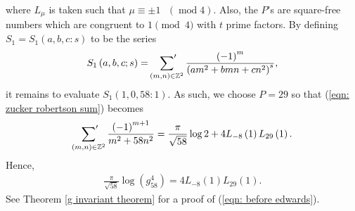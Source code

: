 \documentclass[11pt]{amsart}
\theoremstyle{definition}
\numberwithin{theorem}{section}
\begin{document}
where $L_{\mu}$ is taken such that $\mu\equiv \pm 1\text{ }\left(\operatorname{mod}4\right)$. Also, the $P$'s are square-free numbers which are congruent to $1 \pmod 4$ with $t$ prime factors. By defining $S_1=S_1\left(a,b,c:s\right)$ to be the series \cite{zucker} \begin{align*}
    S_1\left(a,b,c;s\right)=\sideset{}{'}\sum_{\left(m,n\right)\in \mathbb Z^2}\frac{\left(-1\right)^m}{\left(am^2+bmn+cn^2\right)^s},
\end{align*}
it remains to evaluate $S_1\left(1,0,58:1\right)$. As such, we choose $P=29$ so that (\ref{eqn: zucker robertson sum}) becomes \begin{align}\label{eqn: edwards l series}
\sideset{}{'}\sum_{\left(m,n\right)\in \mathbb Z^2}\frac{\left(-1\right)^{m+1}}{m^2+58n^2}=\frac{\pi}{\sqrt{58}}\operatorname{log}2+4L_{-8}\left(1\right)L_{29}\left(1\right).
\end{align}
Hence,
\begin{align}\label{eqn: before edwards}
    \frac{\pi}{\sqrt{58}}\operatorname{log}\left(g_{58}^4\right)=4L_{-8}\left(1\right)L_{29}\left(1\right).
\end{align}
See Theorem \ref{g invariant theorem} for a proof of (\ref{eqn: before edwards}).
\end{document}
